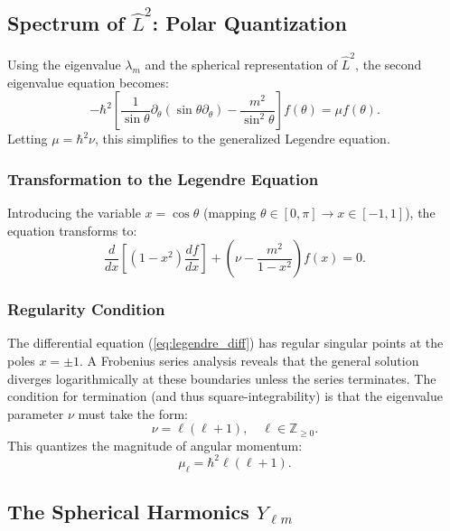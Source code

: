 \subsection{Spectrum of \texorpdfstring{$\hat{L}^2$}{L²}: Polar
Quantization}

Using the eigenvalue $\lambda_m$ and the spherical representation of
$\hat{L}^2$, the second eigenvalue equation becomes:
\begin{equation}
  -\hbar^2 \left[ \frac{1}{\sin\theta} \partial_\theta (\sin\theta
  \partial_\theta) - \frac{m^2}{\sin^2\theta} \right] f(\theta) = \mu f(\theta).
\end{equation}
Letting $\mu = \hbar^2 \nu$, this simplifies to the generalized Legendre
equation.

\subsubsection{Transformation to the Legendre Equation}
Introducing the variable $x = \cos\theta$ (mapping $\theta \in [0, \pi] \to x
\in [-1, 1]$), the equation transforms to:
\begin{equation} \label{eq:legendre_diff}
  \frac{d}{dx} \left[ (1-x^2) \frac{df}{dx} \right] + \left( \nu -
  \frac{m^2}{1-x^2} \right) f(x) = 0.
\end{equation}

\subsubsection{Regularity Condition}
The differential equation (\ref{eq:legendre_diff}) has regular singular points
at the poles $x = \pm 1$. A Frobenius series analysis reveals that the general
solution diverges logarithmically at these boundaries unless the series
terminates. The condition for termination (and thus square-integrability) is
that the eigenvalue parameter $\nu$ must take the form:
\begin{equation}
  \nu = \ell(\ell+1), \quad \ell \in \mathbb{Z}_{\ge 0}.
\end{equation}
This quantizes the magnitude of angular momentum:
\begin{equation}
  \mu_\ell = \hbar^2 \ell(\ell+1).
\end{equation}

\subsection{The Spherical Harmonics \texorpdfstring{$Y_{\ell m}$}{Ylm}}

